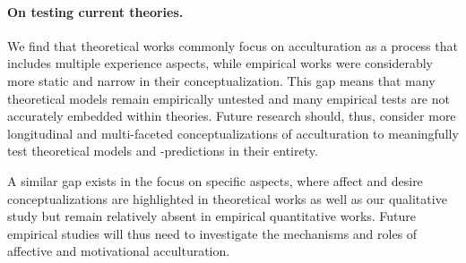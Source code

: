 \documentclass[man, 12pt, a4paper, mask]{apa7}
\begin{document}
\paragraph{On testing current theories.} We find that theoretical works commonly focus on acculturation as a process that includes multiple experience aspects, while empirical works were considerably more static and narrow in their conceptualization. This gap means that many theoretical models remain empirically untested and many empirical tests are not accurately embedded within theories. Future research should, thus, consider more longitudinal and multi-faceted conceptualizations of acculturation to meaningfully test theoretical models and -predictions in their entirety.

A similar gap exists in the focus on specific aspects, where affect and desire conceptualizations are highlighted in theoretical works as well as our qualitative study but remain relatively absent in empirical quantitative works. Future empirical studies will thus need to investigate the mechanisms and roles of affective and motivational acculturation.

\end{document}
